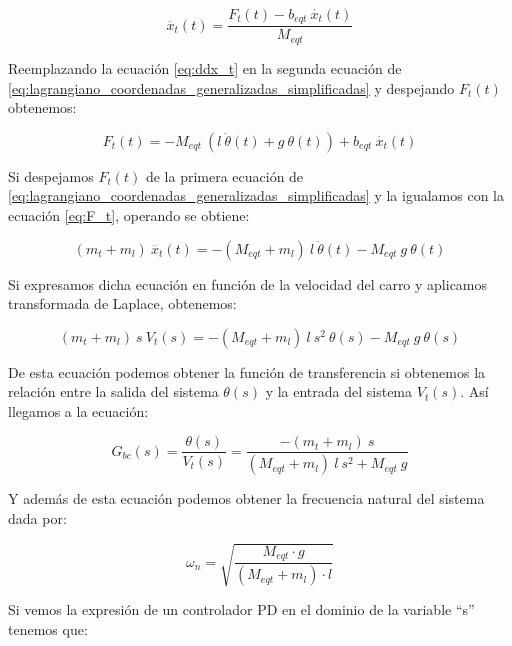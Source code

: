 \documentclass[11pt]{article}
\begin{document}
\begin{equation}
	\label{eq:ddx_t}
	\ddot{x_t}(t)=\frac{F_t(t)-b_{eqt}\ \dot{x_t}(t)}{M_{eqt}}
\end{equation}

Reemplazando la ecuación \ref{eq:ddx_t} en la segunda ecuación de \ref{eq:lagrangiano_coordenadas_generalizadas_simplificadas} y despejando $F_{t}(t)$ obtenemos:

\begin{equation}
	\label{eq:F_t}
	F_{t}(t)=-M_{eqt}\ \left ( l\ \ddot{\theta}(t)+g\ \theta(t) \right )+b_{eqt}\ \dot{x_t}(t)
\end{equation}

Si despejamos $F_{t}(t)$ de la primera ecuación de \ref{eq:lagrangiano_coordenadas_generalizadas_simplificadas} y la igualamos con la ecuación \ref{eq:F_t}, operando se obtiene:

\begin{equation}
	\label{eq:F_t_2}
	(m_t+m_l)\ \ddot{x_t}(t)=-(M_{eqt}+m_l)\ l\ \ddot{\theta}(t)-M_{eqt}\ g\ \theta(t)
\end{equation}

Si expresamos dicha ecuación en función de la velocidad del carro y aplicamos transformada de Laplace, obtenemos:

\begin{equation}
	\label{eq:laplace_F_t_2}
	(m_t+m_l)\ s\ V_t(s)=-(M_{eqt}+m_l)\ l\ s^{2}\ \theta(s)-M_{eqt}\ g\ \theta(s)
\end{equation}

De esta ecuación podemos obtener la función de transferencia si obtenemos la relación entre la salida del sistema $\theta(s)$ y la entrada del sistema $V_t(s)$. Así llegamos a la ecuación:

\begin{equation}
	\label{eq:funcion_transferencia}
	G_{bc}(s)=\frac{\theta(s)}{V_t(s)}=\frac{-(m_t+m_l)\ s}{(M_{eqt}+m_l)\ l\ s^{2}+ M_{eqt}\ g}
\end{equation}

Y además de esta ecuación podemos obtener la frecuencia natural del sistema dada por:

\begin{equation}
	\label{eq:frecuencia_natural}
	\omega_{n}=\sqrt{\frac{M_{eqt}\cdot g}{(M_{eqt}+m_l)\cdot l}}
\end{equation}

Si vemos la expresión de un controlador PD en el dominio de la variable ``s'' tenemos que:
\end{document}
